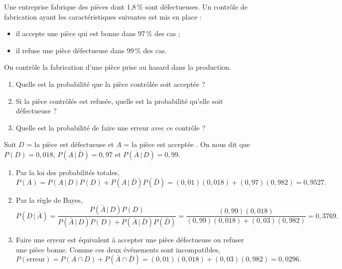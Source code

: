 \begin{exercice}
Une entreprise fabrique des pièces dont 1,8\,\% sont défectueuses. Un contrôle de fabrication
ayant les caractéristiques suivantes est mis en place :
\begin{itemize}
  \item il accepte une pièce qui est bonne dans 97\,\% des cas ;
  \item il refuse une pièce défectueuse dans 99\,\% des cas.
\end{itemize}
On contrôle la fabrication d'une pièce prise au hasard dans la production.
\begin{enumerate}[label=(\alph*)]
  \item Quelle est la probabilité que la pièce contrôlée soit acceptée ?
  \item Si la pièce contrôlée est refusée, quelle est la probabilité qu'elle soit
  défectueuse ?
  \item Quelle est la probabilité de faire une erreur avec ce contrôle ?
\end{enumerate}
\begin{solution}
Soit $D$ = \og la pièce est défectueuse \fg{} et $A$ = \og la pièce est acceptée \fg.
On nous dit que $P(D)=0,018$, $P(A\,|\,\bar D)=0,97$ et $P(\bar A\,|\,D)=0,99$.
\begin{enumerate}[label=(\alph*)]
  \item Par la loi des probabilités totales,
  \[
    P(A)=P(A\,|\,D)P(D)+P(A\,|\,\bar D)P(\bar D)=(0,01)(0,018)+(0,97)(0,982)=0,9527.
  \]
  \item Par la règle de Bayes,
  \[
    P(D\,|\,\bar A)=\frac{P(\bar A\,|\,D)P(D)}{P(\bar A\,|\,D)P(D)+P(\bar A\,|\,\bar D)P(\bar D)}
    =\frac{(0,99)(0,018)}{(0,99)(0,018)+(0,03)(0,982)}=0,3769.
  \]
  \item Faire une erreur est équivalent à accepter une pièce défectueuse ou refuser une pièce
  bonne. Comme ces deux événements sont incompatibles,
  \[
    P(\text{erreur})=P(A\cap D)+P(\bar A\cap \bar D)
    =(0,01)(0,018)+(0,03)(0,982)=0,0296.
  \]
\end{enumerate}
\end{solution}
\end{exercice}


